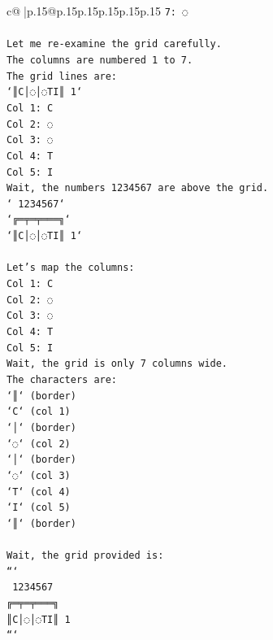 \documentclass{article}
\begin{document}
{\begin{supertabular}{c@{$\;$}|p{.15\linewidth}@{}p{.15\linewidth}p{.15\linewidth}p{.15\linewidth}p{.15\linewidth}p{.15\linewidth}}
{{{\texttt{7: ◌} \\
\\ 
\texttt{Let me re{-}examine the grid carefully.} \\
\texttt{The columns are numbered 1 to 7.} \\
\texttt{The grid lines are:} \\
\texttt{`║C│◌│◌TI║ 1`} \\
\texttt{Col 1: C} \\
\texttt{Col 2: ◌} \\
\texttt{Col 3: ◌} \\
\texttt{Col 4: T} \\
\texttt{Col 5: I} \\
\texttt{Wait, the numbers 1234567 are above the grid.} \\
\texttt{` 1234567`} \\
\texttt{`╔═╤═╤═══╗`} \\
\texttt{`║C│◌│◌TI║ 1`} \\
\\ 
\texttt{Let's map the columns:} \\
\texttt{Col 1: C} \\
\texttt{Col 2: ◌} \\
\texttt{Col 3: ◌} \\
\texttt{Col 4: T} \\
\texttt{Col 5: I} \\
\texttt{Wait, the grid is only 7 columns wide.} \\
\texttt{The characters are:} \\
\texttt{`║` (border)} \\
\texttt{`C` (col 1)} \\
\texttt{`│` (border)} \\
\texttt{`◌` (col 2)} \\
\texttt{`│` (border)} \\
\texttt{`◌` (col 3)} \\
\texttt{`T` (col 4)} \\
\texttt{`I` (col 5)} \\
\texttt{`║` (border)} \\
\\ 
\texttt{Wait, the grid provided is:} \\
\texttt{```} \\
\texttt{ 1234567} \\
\texttt{╔═╤═╤═══╗} \\
\texttt{║C│◌│◌TI║ 1} \\
\texttt{```} \\
}}}
\end{supertabular}}
\end{document}

